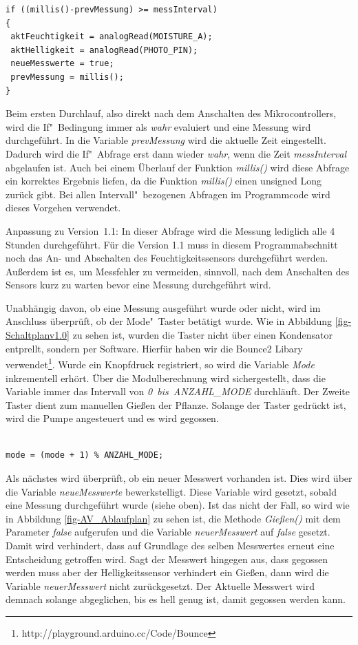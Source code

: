 \begin{lstlisting}[basicstyle=\small]
if ((millis()-prevMessung) >= messInterval)
{
 aktFeuchtigkeit = analogRead(MOISTURE_A);
 aktHelligkeit = analogRead(PHOTO_PIN);
 neueMesswerte = true; 
 prevMessung = millis();
}
\end{lstlisting}

Beim ersten Durchlauf, also direkt nach dem Anschalten des Mikrocontrollers, wird die If"~Bedingung immer als \emph{wahr} evaluiert und eine Messung wird durchgeführt. In die Variable \emph{prevMessung} wird die aktuelle Zeit eingestellt. Dadurch wird die If"~Abfrage erst dann wieder \emph{wahr}, wenn die Zeit \emph{messInterval} abgelaufen ist. Auch bei einem Überlauf der Funktion \emph{millis()} wird diese Abfrage ein korrektes Ergebnis liefen, da die Funktion \emph{millis()} einen unsigned Long zurück gibt. Bei allen Intervall"~bezogenen Abfragen im Programmcode wird dieses Vorgehen verwendet. 

Anpassung zu Version~1.1: In dieser Abfrage wird die Messung lediglich alle 4 Stunden durchgeführt. Für die Version 1.1 muss in diesem Programmabschnitt noch das An- und Abschalten des Feuchtigkeitssensors durchgeführt werden. Außerdem ist es, um Messfehler zu vermeiden, sinnvoll, nach dem Anschalten des Sensors kurz zu warten bevor eine Messung durchgeführt wird.

Unabhängig davon, ob eine Messung ausgeführt wurde oder nicht, wird im Anschluss überprüft, ob der Mode"~Taster betätigt wurde. Wie in Abbildung \ref{fig-Schaltplanv1.0} zu sehen ist, wurden die Taster nicht über einen Kondensator entprellt, sondern per Software. Hierfür haben wir die Bounce2 Libary verwendet\footnote{http://playground.arduino.cc/Code/Bounce}. Wurde ein Knopfdruck registriert, so wird die Variable \emph{Mode} inkrementell erhört. Über die Modulberechnung wird sichergestellt, dass die Variable immer das Intervall von \emph{0~bis~ANZAHL\_MODE} durchläuft. Der Zweite Taster dient zum manuellen Gießen der Pflanze. Solange der Taster gedrückt ist, wird die Pumpe angesteuert und es wird gegossen. 

\begin{lstlisting}[basicstyle=\small]

mode = (mode + 1) % ANZAHL_MODE;

\end{lstlisting}

Als nächstes wird überprüft, ob ein neuer Messwert vorhanden ist.
Dies wird über die Variable \emph{neueMesswerte} bewerkstelligt. Diese Variable wird gesetzt, sobald eine Messung durchgeführt wurde (siehe oben).
Ist das nicht der Fall, so wird wie in Abbildung \ref{fig-AV_Ablaufplan} zu sehen ist, die Methode \emph{Gießen()} mit dem Parameter \emph{false} aufgerufen und die Variable \emph{neuerMesswert} auf \emph{false} gesetzt.
Damit wird verhindert, dass auf Grundlage des selben Messwertes erneut eine Entscheidung getroffen wird.
Sagt der Messwert hingegen aus, dass gegossen werden muss aber der Helligkeitssensor verhindert ein Gießen, dann wird die Variable \emph{neuerMesswert} nicht zurückgesetzt.
Der Aktuelle Messwert wird demnach solange abgeglichen, bis es hell genug ist, damit gegossen werden kann.

